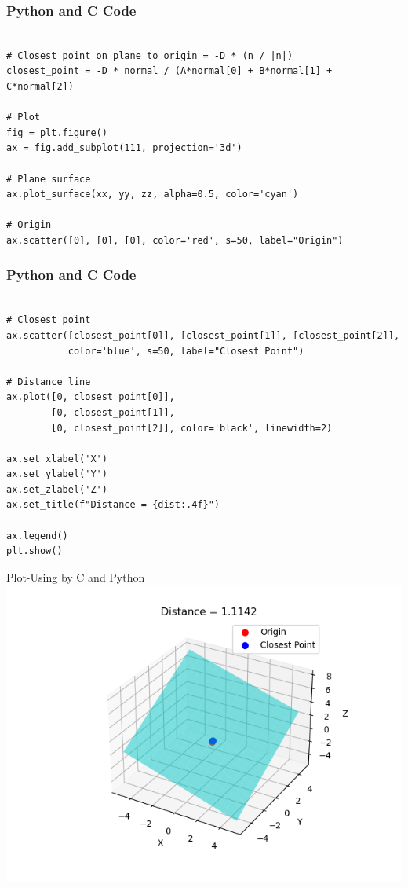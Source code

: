 \documentclass{beamer}
\begin{document}
\begin{frame}[fragile]
\frametitle{Python and C Code}

\begin{lstlisting}

# Closest point on plane to origin = -D * (n / |n|)
closest_point = -D * normal / (A*normal[0] + B*normal[1] + C*normal[2])

# Plot
fig = plt.figure()
ax = fig.add_subplot(111, projection='3d')

# Plane surface
ax.plot_surface(xx, yy, zz, alpha=0.5, color='cyan')

# Origin
ax.scatter([0], [0], [0], color='red', s=50, label="Origin")
\end{lstlisting}

\end{frame}


\begin{frame}[fragile]
\frametitle{Python and C Code}

\begin{lstlisting}

# Closest point
ax.scatter([closest_point[0]], [closest_point[1]], [closest_point[2]],
           color='blue', s=50, label="Closest Point")

# Distance line
ax.plot([0, closest_point[0]],
        [0, closest_point[1]],
        [0, closest_point[2]], color='black', linewidth=2)

ax.set_xlabel('X')
ax.set_ylabel('Y')
ax.set_zlabel('Z')
ax.set_title(f"Distance = {dist:.4f}")

ax.legend()
plt.show()
\end{lstlisting}

\end{frame}


\begin{frame}{Plot-Using by C and Python}
    \centering
    \includegraphics[width=\columnwidth, height=0.8\textheight, keepaspectratio]{Figs/Fig7.1.png}     
\end{frame}
\end{document}
